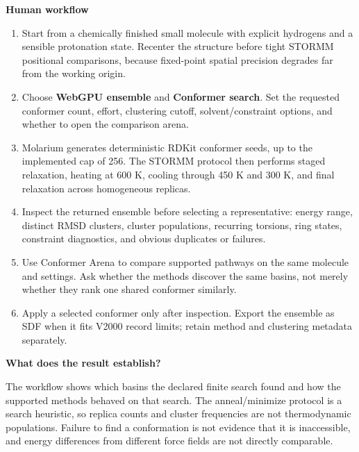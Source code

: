 \documentclass[10pt,letterpaper]{article}
\newcommand{\subhead}[1]{%
  \par\needspace{2\baselineskip}\vspace{2.5pt}%
  {\fontsize{10.91}{13.1}\selectfont\bfseries #1}\par\vspace{-1.5pt}}
\begin{document}
\subhead{Human workflow}

\begin{enumerate}
\item Start from a chemically finished small molecule with explicit hydrogens and a sensible protonation state. Recenter the structure before tight STORMM positional comparisons, because fixed-point spatial precision degrades far from the working origin.
\item Choose \textbf{WebGPU ensemble} and \textbf{Conformer search}. Set the requested conformer count, effort, clustering cutoff, solvent/constraint options, and whether to open the comparison arena.
\item Molarium generates deterministic RDKit conformer seeds, up to the implemented cap of 256. The STORMM protocol then performs staged relaxation, heating at 600 K, cooling through 450 K and 300 K, and final relaxation across homogeneous replicas.
\item Inspect the returned ensemble before selecting a representative: energy range, distinct RMSD clusters, cluster populations, recurring torsions, ring states, constraint diagnostics, and obvious duplicates or failures.
\item Use Conformer Arena to compare supported pathways on the same molecule and settings. Ask whether the methods discover the same basins, not merely whether they rank one shared conformer similarly.
\item Apply a selected conformer only after inspection. Export the ensemble as SDF when it fits V2000 record limits; retain method and clustering metadata separately.
\end{enumerate}

\subhead{What does the result establish?}

The workflow shows which basins the declared finite search found and how the supported methods behaved on that search. The anneal/minimize protocol is a search heuristic, so replica counts and cluster frequencies are not thermodynamic populations. Failure to find a conformation is not evidence that it is inaccessible, and energy differences from different force fields are not directly comparable.
\end{document}
